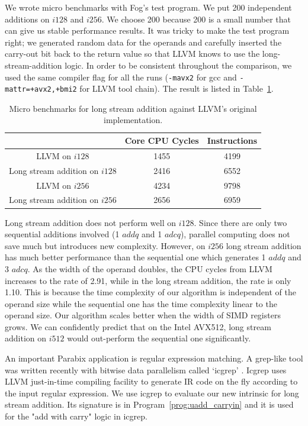 We wrote micro benchmarks with Fog's test program. We put 200 independent additions on $i128$ and $i256$. We choose 200 because 200 is a small number that can give us stable performance results. It was tricky to make the test program right; we generated random data for the operands and carefully inserted the carry-out bit back to the return value so that LLVM knows to use the long-stream-addition logic. In order to be consistent throughout the comparison, we used the same compiler flag for all the runs ({\tt -mavx2} for gcc and {\tt -mattr=+avx2,+bmi2} for LLVM tool chain). The result is listed in Table~\ref{table:lsadd_micro}.

\begin{table}[h]
\centering
\begin{tabular}{|c|c|c|}
\hline
                             & Core CPU Cycles & Instructions \\ \hline
LLVM on $i128$                 & 1455            & 4199         \\ \hline
Long stream addition on $i128$ & 2416            & 6552         \\ \hline
LLVM on $i256$                 & 4234            & 9798         \\ \hline
Long stream addition on $i256$ & 2656            & 6959        \\ \hline
\end{tabular}
\caption{Micro benchmarks for long stream addition against LLVM's original implementation.}
\label{table:lsadd_micro}
\end{table}

Long stream addition does not perform well on $i128$. Since there are only two sequential additions involved (1 $addq$ and 1 $adcq$), parallel computing does not save much but introduces new complexity. However, on $i256$ long stream addition has much better performance than the sequential one which generates 1 $addq$ and 3 $adcq$. As the width of the operand doubles, the CPU cycles from LLVM increases to the rate of 2.91, while in the long stream addition, the rate is only 1.10. This is because the time complexity of our algorithm is independent of the operand size while the sequential one has the time complexity linear to the operand size. Our algorithm scales better when the width of SIMD registers grows. We can confidently predict that on the Intel AVX512, long stream addition on $i512$ would out-perform the sequential one significantly.

An important Parabix application is regular expression matching. A grep-like tool was written recently with bitwise data parallelism called `icgrep' \cite{dale_icgrep}. Icgrep uses LLVM just-in-time compiling facility to generate IR code on the fly according to the input regular expression. We use icgrep to evaluate our new intrinsic for long stream addition. Its signature is in Program~\ref{prog:uadd_carryin} and it is used for the "add with carry" logic in icgrep.

